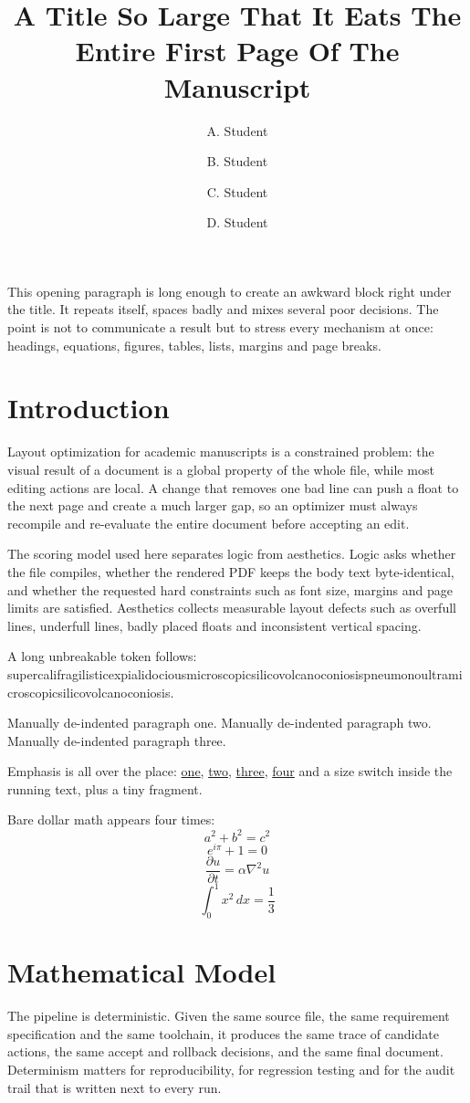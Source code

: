 \documentclass[10pt,a4paper,fleqn]{article}
\title{\Huge A Title So Large That It Eats The Entire First Page Of The Manuscript}
\author{A. Student \and B. Student \and C. Student \and D. Student}
\date{}
\begin{document}
\maketitle
This opening paragraph is long enough to create an awkward block right under the
title. It repeats itself, spaces badly and mixes several poor decisions. The
point is not to communicate a result but to stress every mechanism at once:
headings, equations, figures, tables, lists, margins and page breaks.
\section{Introduction}
Layout optimization for academic manuscripts is a constrained problem: the visual result of a document is a global property of the whole file, while most editing actions are local. A change that removes one bad line can push a float to the next page and create a much larger gap, so an optimizer must always recompile and re-evaluate the entire document before accepting an edit.

The scoring model used here separates logic from aesthetics. Logic asks whether the file compiles, whether the rendered PDF keeps the body text byte-identical, and whether the requested hard constraints such as font size, margins and page limits are satisfied. Aesthetics collects measurable layout defects such as overfull lines, underfull lines, badly placed floats and inconsistent vertical spacing.

A long unbreakable token follows: supercalifragilisticexpialidociousmicroscopicsilicovolcanoconiosispneumonoultramicroscopicsilicovolcanoconiosis.

\noindent Manually de-indented paragraph one.
\noindent Manually de-indented paragraph two.
\noindent Manually de-indented paragraph three.

\vspace{3cm}
\vspace{-1.5cm}

Emphasis is all over the place: \underline{one}, \underline{two},
\underline{three}, \underline{four} and {\Large a size switch} inside the
running text, plus {\tiny a tiny fragment}.

Bare dollar math appears four times:
$$a^2 + b^2 = c^2$$
$$e^{i\pi} + 1 = 0$$
$$\frac{\partial u}{\partial t} = \alpha \nabla^2 u$$
$$\int_0^1 x^2\,dx = \frac{1}{3}$$

\newpage


\section{Mathematical Model}
The pipeline is deterministic. Given the same source file, the same requirement specification and the same toolchain, it produces the same trace of candidate actions, the same accept and rollback decisions, and the same final document. Determinism matters for reproducibility, for regression testing and for the audit trail that is written next to every run.
\end{document}
